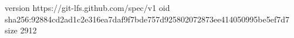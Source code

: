 version https://git-lfs.github.com/spec/v1
oid sha256:92884cd2ad1c2e316ea7daf9f7bde757d925802072873ee414050995be5ef7d7
size 2912
